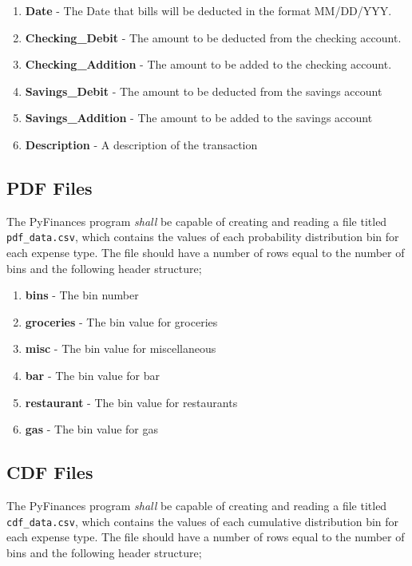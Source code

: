 {\begin{enumerate}
    \item {\textbf{Date}} - The Date that bills will be deducted in the 
	                    format MM/DD/YYY.
    \item {\textbf{Checking\_Debit}} - The amount to be deducted from the 
	                               checking account.
    \item {\textbf{Checking\_Addition}} - The amount to be added to the 
	                                  checking account.
    \item {\textbf{Savings\_Debit}} - The amount to be deducted from the savings
	                              account
    \item {\textbf{Savings\_Addition}} - The amount to be added to the savings 
	                                 account 
    \item {\textbf{Description}} - A description of the transaction
\end{enumerate}

\subsection{PDF Files}
The PyFinances program {\textit{shall}} be capable of creating and reading a file
titled {\texttt{pdf\_data.csv}}, which contains the values of each probability 
distribution bin for each expense type.  The file should have a number of rows 
equal to the number of bins and the following header structure;

\begin{enumerate}
    \item {\textbf{bins}} - The bin number 
    \item {\textbf{groceries}} - The bin value for groceries
    \item {\textbf{misc}} - The bin value for miscellaneous
    \item {\textbf{bar}} - The bin value for bar
    \item {\textbf{restaurant}} - The bin value for restaurants
    \item {\textbf{gas}} - The bin value for gas
\end{enumerate}

\subsection{CDF Files}
The PyFinances program {\textit{shall}} be capable of creating and reading a file
titled {\texttt{cdf\_data.csv}}, which contains the values of each cumulative
distribution bin for each expense type.  The file should have a number of rows 
equal to the number of bins and the following header structure;

}
